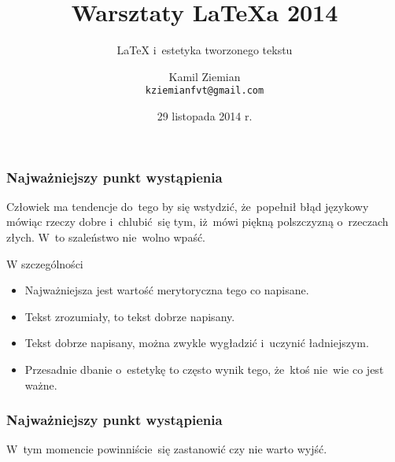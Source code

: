 \documentclass[10pt,t]{beamer}
\title{Warsztaty \LaTeX a 2014}
\subtitle{\LaTeX{} i~estetyka tworzonego tekstu}
\author{Kamil Ziemian \\
 \texttt{kziemianfvt@gmail.com}}
\date[29.11.2014]{29 listopada 2014 r.}
\begin{document}






\RaggedRight





\maketitle










\begin{frame}
  \frametitle{Najważniejszy punkt wystąpienia}


  Człowiek ma tendencje do~tego by się wstydzić, że~popełnił błąd
  językowy mówiąc rzeczy dobre i~chlubić~się tym, iż~mówi piękną
  polszczyzną o~rzeczach złych. W~to szaleństwo nie~wolno wpaść.

  W szczególności
  \begin{itemize}
    \RaggedRight

  \item Najważniejsza jest wartość merytoryczna tego co napisane.

  \item Tekst zrozumiały, to tekst dobrze napisany.

  \item Tekst dobrze napisany, można zwykle wygładzić i~uczynić
    ładniejszym.

  \item Przesadnie dbanie o~estetykę to często wynik tego, że~ktoś nie~wie
    co jest ważne.

  \end{itemize}

\end{frame}





\begin{frame}
  \frametitle{Najważniejszy punkt wystąpienia}


  W~tym momencie powinniście~się zastanowić czy nie warto wyjść.

\end{frame}
\end{document}

